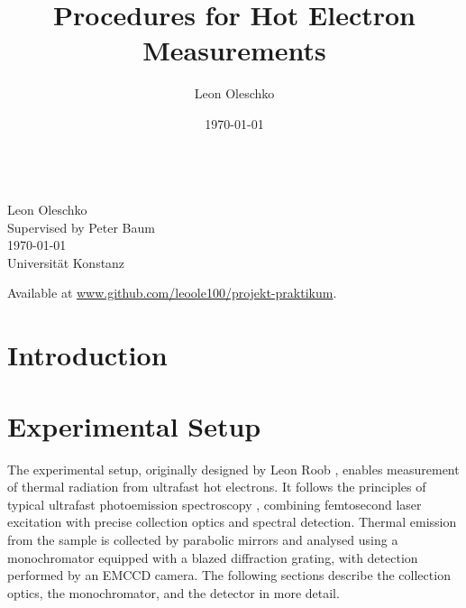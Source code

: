 \documentclass[
	parskip=half,
	a4paper,
]{scrarticle}
\begin{document}
\title{Procedures for Hot Electron Measurements}
\author{Leon Oleschko}
\date{\dotdate\today}

\begin{titlepage}
    \sffamily
    \vspace*{3cm}
    {
        \fontsize{32}{32}
    }
    \vspace{.25cm}\\
    {
        \Large
        Leon Oleschko\\
        Supervised by Peter Baum
        \vspace{.05cm}\\
        \dotdate\today\\
        Universität Konstanz
    }
    \vfill
    {
        \normalfont\normalsize

    }
    \vfill
    \begin{flushright}
        Available at \url{www.github.com/leoole100/projekt-praktikum}.
    \end{flushright}
\end{titlepage}


\clearpage


\section*{Introduction}

\section{Experimental Setup}
The experimental setup, originally designed by Leon Roob \autocite{roob_thermal_2025}, enables measurement of thermal radiation from ultrafast hot electrons. It follows the principles of typical ultrafast photoemission spectroscopy \autocite{lui_ultrafast_2010}, combining femtosecond laser excitation with precise collection optics and spectral detection. Thermal emission from the sample is collected by parabolic mirrors and analysed using a monochromator equipped with a blazed diffraction grating, with detection performed by an EMCCD camera. The following sections describe the collection optics, the monochromator, and the detector in more detail.
\end{document}
